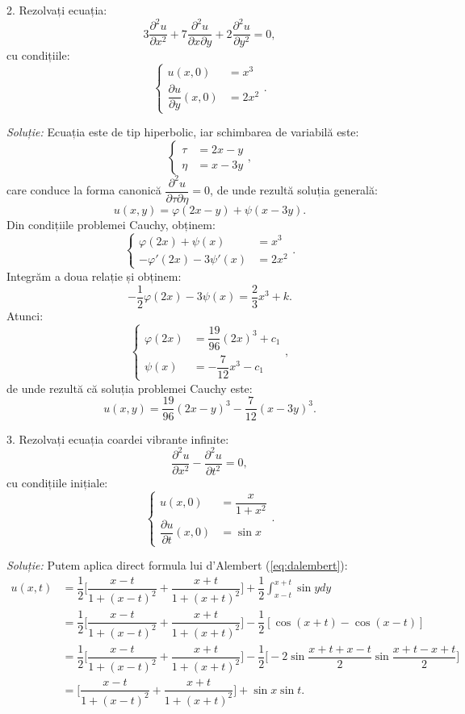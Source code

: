 \vspace{0.3cm}

2. Rezolvați ecuația:
\[
  3 \dfrac{\partial^2 u}{\partial x^2} + 7 \dfrac{\partial^2 u}{\partial x\partial y} + %
  2 \dfrac{\partial^2 u}{\partial y^2} = 0,
\]
cu condițiile:
\[
  \begin{cases}
    u(x, 0) &= x^3 \\
    \dfrac{\partial u}{\partial y}(x, 0) &= 2x^2
  \end{cases}.
\]

\vspace{0.3cm}

\emph{Soluție:} Ecuația este de tip hiperbolic, iar schimbarea de variabilă este:
\[
  \begin{cases}
    \tau &= 2x - y \\
    \eta &= x - 3y
  \end{cases},
\]
care conduce la forma canonică $ \dfrac{\partial^2 u}{\partial \tau\partial \eta} = 0 $,
de unde rezultă soluția generală:
\[
  u(x, y) = \varphi(2x - y) + \psi(x - 3y).
\]
Din condițiile problemei Cauchy, obținem:
\[
  \begin{cases}
    \varphi(2x) + \psi(x) &= x^3 \\
    -\varphi'(2x) - 3 \psi'(x) &= 2x^2
  \end{cases}.
\]
Integrăm a doua relație și obținem:
\[
  -\dfrac{1}{2} \varphi(2x) - 3 \psi(x) = \dfrac{2}{3}x^3 + k.
\]
Atunci:
\[
  \begin{cases}
    \varphi(2x) &= \dfrac{19}{96}(2x)^3 + c_1 \\
    \psi(x) &= -\dfrac{7}{12}x^3 - c_1
  \end{cases},
\]
de unde rezultă că soluția problemei Cauchy este:
\[
  u(x, y) = \dfrac{19}{96}(2x - y)^3 - \dfrac{7}{12}(x - 3y)^3.
\]

3. Rezolvați ecuația coardei vibrante infinite:
\[
  \dfrac{\partial^2 u}{\partial x^2} - \dfrac{\partial^2 u}{\partial t^2} = 0,
\]
cu condițiile inițiale:
\[
  \begin{cases}
    u(x, 0) &= \dfrac{x}{1 + x^2} \\
    \dfrac{\partial u}{\partial t}(x, 0) &= \sin x
  \end{cases}.
\]

\vspace{0.3cm}

\emph{Soluție:} Putem aplica direct formula lui d'Alembert (\ref{eq:dalembert}):
\begin{align*}
  u(x, t) &= \dfrac{1}{2} \Big[ \dfrac{x - t}{1 + (x - t)^2} + \dfrac{x + t}{1 + (x + t)^2} \Big] + %
            \dfrac{1}{2} \int_{x - t}^{x + t} \sin y dy \\
          &= \dfrac{1}{2} \Big[ \dfrac{x - t}{1 + (x - t)^2} + \dfrac{x + t}{1 + (x + t)^2} \Big] - %
            \dfrac{1}{2}[\cos(x + t) - \cos(x - t)] \\
          &= \dfrac{1}{2} \Big[ \dfrac{x - t}{1 + (x - t)^2} + \dfrac{x + t}{1 + (x + t)^2} \Big] - %
            \dfrac{1}{2} \Big[ -2\sin \dfrac{x + t + x - t}{2} \sin \dfrac{x + t - x + t}{2} \Big] \\
          &= \Big[ \dfrac{x - t}{1 + (x - t)^2} + \dfrac{x + t}{1 + (x + t)^2} \Big] + \sin x \sin t.
\end{align*}

